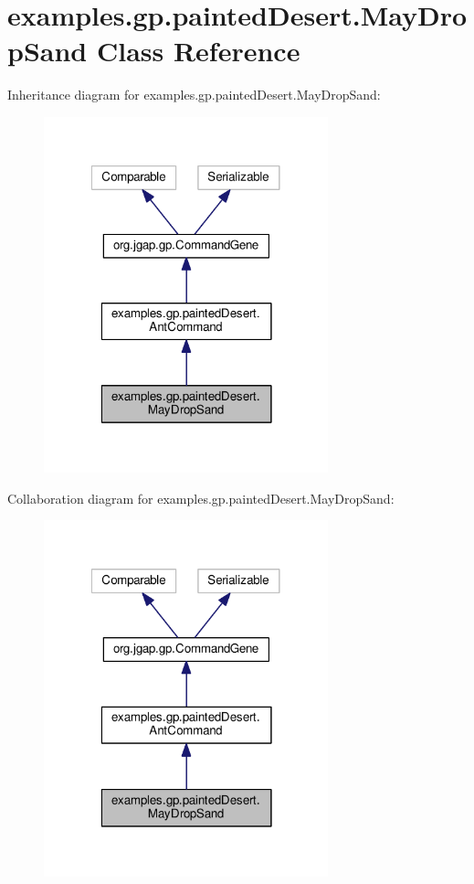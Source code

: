 \hypertarget{classexamples_1_1gp_1_1painted_desert_1_1_may_drop_sand}{\section{examples.\-gp.\-painted\-Desert.\-May\-Drop\-Sand Class Reference}
\label{classexamples_1_1gp_1_1painted_desert_1_1_may_drop_sand}
}


Inheritance diagram for examples.\-gp.\-painted\-Desert.\-May\-Drop\-Sand\-:
\nopagebreak
\begin{figure}[H]
\begin{center}
\leavevmode
\includegraphics[width=233pt]{classexamples_1_1gp_1_1painted_desert_1_1_may_drop_sand__inherit__graph}
\end{center}
\end{figure}


Collaboration diagram for examples.\-gp.\-painted\-Desert.\-May\-Drop\-Sand\-:
\nopagebreak
\begin{figure}[H]
\begin{center}
\leavevmode
\includegraphics[width=233pt]{classexamples_1_1gp_1_1painted_desert_1_1_may_drop_sand__coll__graph}
\end{center}
\end{figure}
